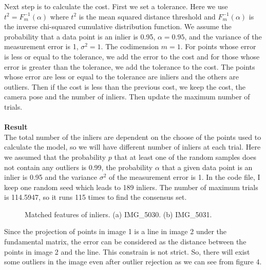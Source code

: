 \documentclass{../../assignment}
\begin{document}
\begin{problemlist}
\begin{enumerate}
Next step is to calculate the cost. First we set a tolerance. Here we use $t^2 = F_m^{-1}(\alpha)$ where $t^2$ is the mean squared distance threshold and $F_m^{-1}(\alpha)$ is the inverse chi-squared cumulative distribution function. We assume the probability that a data point is an inlier is 0.95, $\alpha = 0.95$, and the variance of the measurement error is 1, $\sigma^2 = 1$. The codimension $m = 1$. For points whose error is less or equal to the tolerance, we add the error to the cost and for those whose error is greater than the tolerance, we add the tolerance to the cost. The points whose error are less or equal to the tolerance are inliers and the others are outliers. Then if the cost is less than the previous cost, we keep the cost, the camera pose and the number of inliers. Then update the maximum number of trials.
\\\\
\textbf{Result}\\
The total number of the inliers are dependent on the choose of the points used to calculate the model, so we will have different number of inliers at each trial. Here we assumed that the probability $p$ that at least one of the random samples does not contain any outliers is 0.99, the probability $\alpha$ that a given data point is an inlier is 0.95 and the variance $\sigma^2$ of the measurement error is 1. In the code file, I keep one random seed which leads to 189 inliers. The number of maximum trials is 114.5947, so it runs 115 times to find the consensus set.
\begin{figure}[H]
\caption{Matched features of inliers. (a) IMG\_5030. (b) IMG\_5031.}
\label{fig:images}
\end{figure} 
Since the projection of points in image 1 is a line in image 2 under the fundamental matrix, the error can be considered as the distance between the points in image 2 and the line. This constrain is not strict. So, there will exist some outliers in the image even after outlier rejection as we can see from figure 4.


\end{enumerate}
\end{problemlist}
\end{document}
